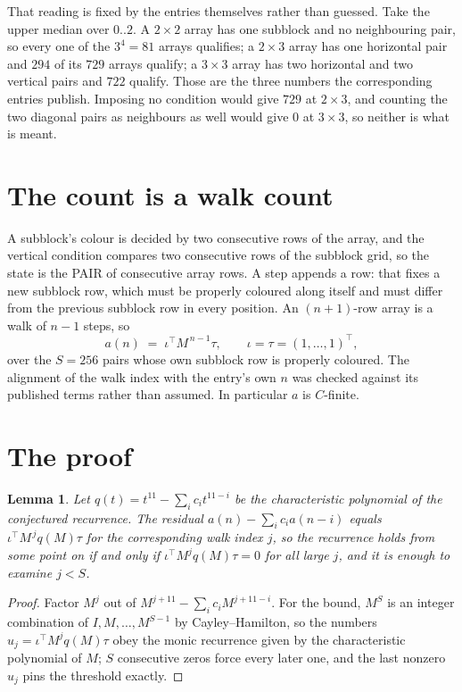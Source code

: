 \documentclass[11pt,a4paper]{article}
\theoremstyle{plain}
\newtheorem{lemma}[theorem]{Lemma}
\theoremstyle{definition}
\begin{document}
That reading is fixed by the entries themselves rather than guessed. Take the upper median
over $0..2$. A $2\times2$ array has one subblock and no neighbouring pair, so every one of the
$3^4=81$ arrays qualifies; a $2\times3$ array has one horizontal pair and $294$ of its $729$
arrays qualify; a $3\times3$ array has two horizontal and two vertical pairs and $722$
qualify. Those are the three numbers the corresponding entries publish. Imposing no condition
would give $729$ at $2\times3$, and counting the two diagonal pairs as neighbours as well
would give $0$ at $3\times3$, so neither is what is meant.

\section{The count is a walk count}

A subblock's colour is decided by two consecutive rows of the array, and
the vertical condition compares two consecutive rows of the subblock grid, so the state is the
PAIR of consecutive array rows. A step appends a row: that fixes a new subblock row, which
must be properly coloured along itself and must differ from the previous subblock row in every
position. An $(n+1)$-row array is a walk of $n-1$ steps, so
\[
a(n)\;=\;\iota^{\!\top}M^{\,n-1}\tau,\qquad\iota=\tau=(1,\dots,1)^{\!\top},
\]
over the $S=256$ pairs whose own subblock row is properly coloured.
The alignment of the walk index with the entry's own $n$ was checked against its published
terms rather than assumed. In particular $a$ is $C$-finite.

\section{The proof}

\begin{lemma}\label{lem:crit}
Let $q(t)=t^{11}-\sum_i c_it^{11-i}$ be the characteristic polynomial of the
conjectured recurrence. The residual $a(n)-\sum_ic_ia(n-i)$ equals
$\iota^{\!\top}M^{\,j}q(M)\tau$ for the corresponding walk index $j$, so the recurrence
holds from some point on if and only if $\iota^{\!\top}M^{j}q(M)\tau=0$ for all large $j$,
and it is enough to examine $j<S$.
\end{lemma}

\begin{proof}
Factor $M^{j}$ out of $M^{j+11}-\sum_ic_iM^{j+11-i}$. For the bound, $M^{S}$
is an integer combination of $I,M,\dots,M^{S-1}$ by Cayley--Hamilton, so the numbers
$u_j=\iota^{\!\top}M^{j}q(M)\tau$ obey the monic recurrence given by the characteristic
polynomial of $M$; $S$ consecutive zeros force every later one, and the last nonzero $u_j$
pins the threshold exactly.
\end{proof}
\end{document}
